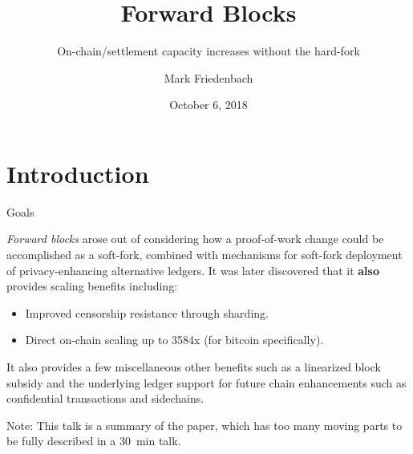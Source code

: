 \documentclass[10pt]{beamer}
\title{Forward Blocks}
\subtitle{On-chain/settlement capacity increases without the hard-fork}
\date{October 6, 2018}
\author{Mark Friedenbach}
\institute{No organizational affiliation}
\begin{document}
\maketitle


\section{Introduction}

\begin{frame}{Goals}

  \emph{Forward blocks} arose out of considering how a proof-of-work
  change could be accomplished as a soft-fork, combined with
  mechanisms for soft-fork deployment of privacy-enhancing alternative
  ledgers.  It was later discovered that it \textbf{also} provides
  scaling benefits including:

  \begin{itemize}

  \item Improved censorship resistance through sharding.

  \item Direct on-chain scaling up to \num{3584}x (for bitcoin
    specifically).

  \end{itemize}

  It also provides a few miscellaneous other benefits such as a
  linearized block subsidy and the underlying ledger support for
  future chain enhancements such as confidential transactions and
  sidechains.

  \alert{Note}: This talk is a summary of the paper, which has too
  many moving parts to be fully described in a \SI{30}{\minute} talk.

\end{frame}
\end{document}
